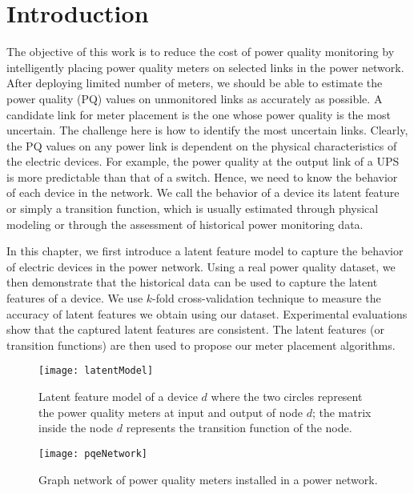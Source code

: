 \label{chap:latentF}
\section{Introduction}
The objective of this work is to reduce the cost of power quality monitoring by intelligently placing power quality meters on selected links in the power network. After deploying limited number of meters, we should be able to estimate the power quality (PQ) values on unmonitored links as accurately as possible. A candidate link for meter placement is the one whose power quality is the most uncertain. The challenge here is how to identify the most uncertain links. Clearly, the PQ values on any power link is dependent on the physical characteristics of the electric devices. For example, the power quality at the output link of a UPS is more predictable than that of a switch. Hence, we need to know the behavior of each device in the network. We call the behavior of a device its latent feature or simply a transition function, which is usually estimated through physical modeling or through the assessment of historical power monitoring data.

In this chapter, we first introduce a latent feature model to capture the behavior of electric devices in the power network. Using a real power quality dataset, we then demonstrate that the historical data can be used to capture the latent features of a device. We use $k$-fold cross-validation technique to measure the accuracy of latent features we obtain using our dataset. Experimental evaluations show that the captured latent features are consistent. The latent features (or transition functions) are then used to propose our meter placement algorithms.

\begin{figure}[!t]
\center
\texttt{[image: latentModel]}
\caption{Latent feature model of a device $d$ where the two circles represent the power quality meters at input and output of node $d$; the matrix inside the node $d$ represents the transition function of the node.}
\label{fig:latentModel}

\end{figure}

\begin{figure}[!t]
\center
\texttt{[image: pqeNetwork]}
\caption{Graph network of power quality meters installed in a power network.}
\label{fig:pqeNetwork}
\end{figure}

